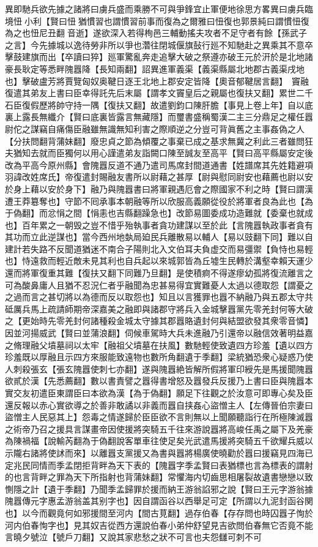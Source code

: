 異即馳兵欲先據之諸將曰虜兵盛而乘勝不可與爭鋒宜止軍便地徐思方畧異曰虜兵臨境忸小利【賢曰忸猶慣習也謂慣習前事而復為之爾雅曰忸復也郭景純曰謂慣忸復為之也忸尼丑翻音逝】遂欲深入若得栒邑三輔動搖夫攻者不足守者有餘【孫武子之言】今先據城以逸待勞非所以爭也濳往閉城偃旗鼔行廵不知馳赴之異乘其不意卒擊鼓建旗而出【卒讀曰猝】廵軍驚亂奔走追擊大破之祭遵亦破王元於汧於是北地諸豪長耿定等悉畔隗囂降【長知兩翻】詔異進軍義渠【義渠縣屬北地郡古義渠戌地也】擊破盧芳將賈覽匈奴奥鞬日逐王北地上郡安定皆降【奧音郁鞬居言翻】　竇融復遣其弟友上書曰臣幸得託先后末屬【謂孝文竇皇后之親屬也復扶又翻】累世二千石臣復假歷將帥守持一隅【復扶又翻】故遣劉鈞口陳肝膽【事見上卷上年】自以底裏上露長無纖介【賢曰底裏皆露言無藏隱】而璽書盛稱蜀漢二主三分鼎足之權任囂尉佗之謀竊自痛傷臣融雖無識無知利害之際順逆之分豈可背眞舊之主事姦偽之人【分扶問翻背蒲妹翻】廢忠貞之節為傾覆之事棄已成之基求無冀之利此三者雖問狂夫猶知去就而臣獨何以用心謹遣弟友詣闕口陳至誠友至高平【賢曰高平縣屬安定後改為平高今原州縣】會隗囂反道不通乃遣司馬席封間道通書【姓譜席其先姓籍避項羽諱改姓席氏】帝復遣封賜融友書所以尉藉之甚厚【尉與慰同尉安也藉薦也尉以安於身上藉以安於身下】融乃與隗囂書曰將軍親遇厄會之際國家不利之時【賢曰謂漢遭王莽簒奪也】守節不囘承事本朝融等所以欣服高義願從役於將軍者良為此也【為于偽翻】而忿悁之間【悁恚也吉縣翻躁急也】改節易圖委成功造難就【委棄也就成也】百年累之一朝毁之豈不惜乎殆執事者貪功建謀以至於此【言隗囂執政事者貪有其功而立此逆謀也】當今西州地埶局廹民兵離散易以輔人【易以豉翻下同】難以自建計若失路不反聞道猶迷不南合子陽則北入文伯耳夫負虚交而易彊禦【負恃也易輕也】恃遠救而輕近敵未見其利也自兵起以來城郭皆為丘墟生民轉於溝壑幸賴天運少還而將軍復重其難【復扶又翻下同難乃旦翻】是使積痾不得遂瘳幼孤將復流離言之可為酸鼻庸人且猶不忍況仁者乎融聞為忠甚易得宜實難憂人太過以德取怨【謂憂之之過而言之甚切將以為德而反以取怨也】知且以言獲罪也囂不納融乃與五郡太守共砥厲兵馬上疏請師期帝深嘉美之融即與諸郡守將兵入金城擊囂黨先零羌封何等大破之【更始時先零羌封何諸種殺金城太守據其郡囂賂遺封何與結盟欲發其衆零音憐】因並河揚威武【賢曰並蒲浪翻】伺候車駕時大兵未進融乃引還帝以融信效著明益嘉之脩理融父墳墓祠以太牢【融祖父墳墓在扶風】數馳輕使致遺四方珍羞【遺以四方珍羞既以厚融且示四方來服能致遠物也數所角翻遺于季翻】梁統猶恐衆心疑惑乃使人刺殺張玄【張玄隗囂使刺七亦翻】遂與隗囂絶皆解所假將軍印綬先是馬援聞隗囂欲貳於漢【先悉薦翻】數以書責譬之囂得書增怒及囂發兵反援乃上書曰臣與隗囂本實交友初遣臣東謂臣曰本欲為漢【為于偽翻】願足下往觀之於汝意可即專心矣及臣還反報以赤心實欲導之於善非敢譎以非義而囂自挟姦心盜憎主人【左傳晉伯宗妻曰盜憎主人民惡其上】怨毒之情遂歸於臣臣欲不言則無以上聞願聽詣行在所極陳滅囂之術帝乃召之援具言謀畫帝因使援將突騎五千往來游說囂將高峻任禹之屬下及羌豪為陳禍福【說輸芮翻為于偽翻說客單車往使足矣光武遣馬援將突騎五千欲耀兵威以示隴右諸將使訹而來】以離囂支黨援又為書與囂將楊廣使曉勸於囂曰援竊見四海已定兆民同情而季孟閉拒背畔為天下表的【隗囂字季孟賢曰表猶標也言為標表的謂射的也言背畔之罪為天下所指射也背蒲妹翻】常懼海内切齒思相屠裂故遺書戀戀以致惻隱之計【遺于季翻】乃聞季孟歸罪於援而納王游翁諂邪之說【賢曰王元字游翁據隗囂傳元字惠孟游翁盖其别字也】因自謂函谷以西舉足可定【所謂以九泥封函谷関也】以今而觀竟何如邪援間至河内【間古莧翻】過存伯春【存存問也時囚囂子恂於河内伯春恂字也】見其奴吉從西方還說伯春小弟仲舒望見吉欲問伯春無它否竟不能言曉夕號泣【號戶刀翻】又說其家悲愁之狀不可言也夫怨讎可刺不可